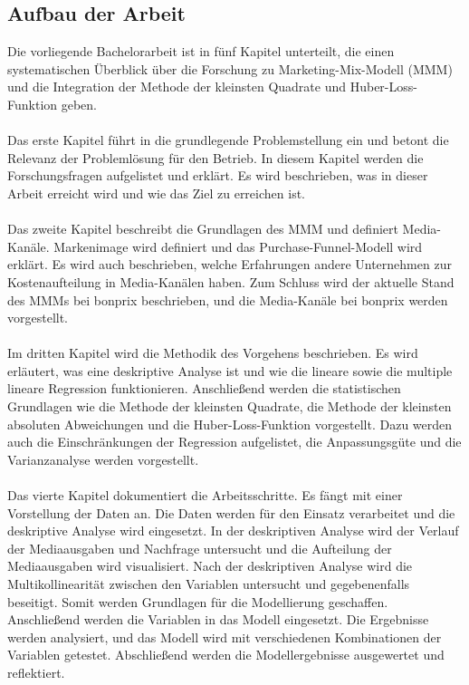 \subsection{Aufbau der Arbeit}
Die vorliegende Bachelorarbeit ist in fünf Kapitel unterteilt, die einen systematischen Überblick über die Forschung zu Marketing-Mix-Modell (\ac{MMM}) und die Integration der Methode der kleinsten Quadrate und Huber-Loss-Funktion geben.\\\\
Das erste Kapitel  führt in die grundlegende Problemstellung ein und betont die Relevanz der Problemlösung für den Betrieb. In diesem Kapitel werden die Forschungsfragen aufgelistet und erklärt. Es wird beschrieben, was in dieser Arbeit erreicht wird und wie das Ziel zu erreichen ist. \\\\
Das zweite Kapitel  beschreibt die Grundlagen des \ac{MMM} und definiert Media-Kanäle. Markenimage wird definiert und das Purchase-Funnel-Modell wird erklärt. Es wird auch beschrieben, welche Erfahrungen andere Unternehmen zur Kostenaufteilung in Media-Kanälen haben. Zum Schluss wird der aktuelle Stand des \ac{MMM}s bei bonprix beschrieben, und die Media-Kanäle bei bonprix werden vorgestellt. \\\\ 
Im dritten Kapitel  wird die Methodik des Vorgehens beschrieben. Es wird erläutert, was eine deskriptive Analyse ist und wie die lineare sowie die multiple lineare Regression funktionieren. Anschließend werden die statistischen Grundlagen wie die Methode der kleinsten Quadrate, die Methode der kleinsten absoluten Abweichungen und die Huber-Loss-Funktion vorgestellt. Dazu werden auch die Einschränkungen der Regression aufgelistet, die Anpassungsgüte und die Varianzanalyse werden vorgestellt.\\\\
Das vierte Kapitel  dokumentiert die Arbeitsschritte. Es fängt mit einer Vorstellung der Daten an. Die Daten werden für den Einsatz verarbeitet und die deskriptive Analyse wird eingesetzt. In der deskriptiven Analyse wird der Verlauf der Mediaausgaben und Nachfrage untersucht und die Aufteilung der Mediaausgaben wird visualisiert. Nach der deskriptiven Analyse wird die Multikollinearität zwischen den Variablen untersucht und gegebenenfalls beseitigt. Somit werden Grundlagen für die Modellierung geschaffen. Anschließend werden die Variablen in das Modell eingesetzt. Die Ergebnisse werden analysiert, und das Modell wird mit verschiedenen Kombinationen der Variablen getestet. Abschließend werden die Modellergebnisse ausgewertet und reflektiert.
